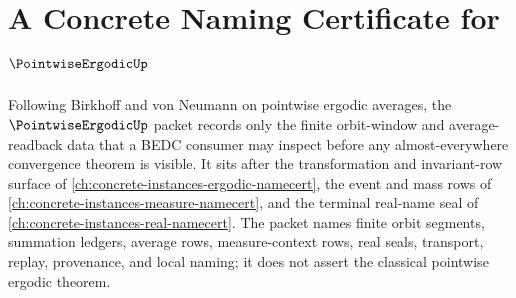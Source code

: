 \chapter{A Concrete Naming Certificate for $\PointwiseErgodicUp$}
\label{ch:concrete-instances-pointwise-ergodic-namecert}

Following Birkhoff and von Neumann on pointwise ergodic averages, the $\PointwiseErgodicUp$ packet records only the finite orbit-window and average-readback data that a BEDC consumer may inspect before any almost-everywhere convergence theorem is visible. It sits after the transformation and invariant-row surface of \autoref{ch:concrete-instances-ergodic-namecert}, the event and mass rows of \autoref{ch:concrete-instances-measure-namecert}, and the terminal real-name seal of \autoref{ch:concrete-instances-real-namecert}. The packet names finite orbit segments, summation ledgers, average rows, measure-context rows, real seals, transport, replay, provenance, and local naming; it does not assert the classical pointwise ergodic theorem.

